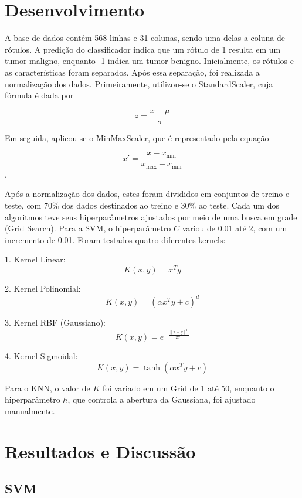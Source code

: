 \documentclass{article} %
\begin{document}
   \section{Desenvolvimento}

   A base de dados contém 568 linhas e 31 colunas, sendo uma delas a coluna de rótulos. A predição do classificador indica que um rótulo de 1 resulta em um tumor maligno, enquanto -1 indica um tumor benigno. Inicialmente, os rótulos e as características foram separados. Após essa separação, foi realizada a normalização dos dados. Primeiramente, utilizou-se o StandardScaler, cuja fórmula é dada por 

   \[
   z = \frac{x - \mu}{\sigma}
   \]

   Em seguida, aplicou-se o MinMaxScaler, que é representado pela equação 

   \[
   x' = \frac{x - x_{\text{min}}}{x_{\text{max}} - x_{\text{min}}}
   \].

   \vspace{1cm}

   Após a normalização dos dados, estes foram divididos em conjuntos de treino e teste, com 70\% dos dados destinados ao treino e 30\% ao teste. Cada um dos algoritmos teve seus hiperparâmetros ajustados por meio de uma busca em grade (Grid Search). Para a SVM, o hiperparâmetro \( C \) variou de 0.01 até 2, com um incremento de 0.01. Foram testados quatro diferentes kernels: 

   1. Kernel Linear:
      \[
      K(x, y) = x^T y
      \]

   2. Kernel Polinomial:
      \[
      K(x, y) = (\alpha x^T y + c)^d
      \]

   3. Kernel RBF (Gaussiano):
      \[
      K(x, y) = e^{-\frac{\|x - y\|^2}{2\sigma^2}}
      \]

   4. Kernel Sigmoidal:
      \[
      K(x, y) = \tanh(\alpha x^T y + c)
      \]

   Para o KNN, o valor de \( K \) foi variado em um Grid de 1 até 50, enquanto o hiperparâmetro \( h \), que controla a abertura da Gaussiana, foi ajustado manualmente.


   \section{Resultados e Discussão}

   \subsection{SVM}
\end{document}
